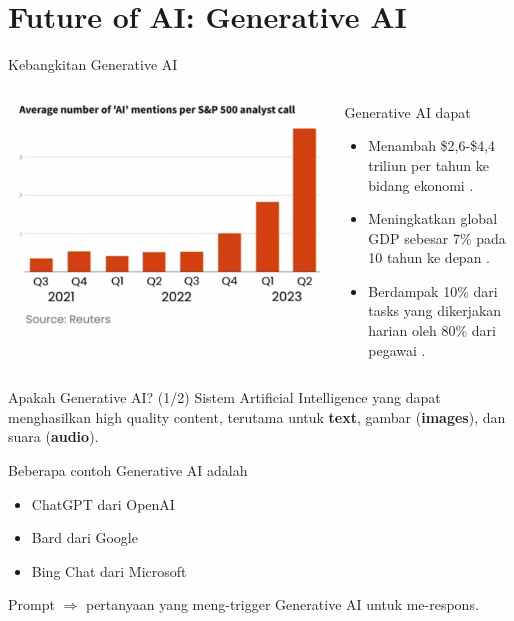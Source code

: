 \documentclass[pdf]{beamer}
\theoremstyle{mystyle}
\begin{document}
\section{Future of AI: Generative AI}
\begin{frame}{Kebangkitan Generative AI}
	\begin{columns}
		\begin{column}{.5\textwidth}
			\begin{center}
				\includegraphics[width=\textwidth]{images/rise-generative-reuters.png}
			\end{center}
		\end{column}
		\begin{column}{.5\textwidth}
			Generative AI dapat
			\begin{itemize}
				\item<2-> Menambah \$2,6-\$4,4 triliun per tahun ke bidang ekonomi \citep{mckinsey2023economic}.
				\item<3-> Meningkatkan global GDP sebesar 7\% pada 10 tahun ke depan \citep{goldman2023large}.
				\item<4-> Berdampak 10\% dari tasks yang dikerjakan harian oleh 80\% dari pegawai \citep{eloundou2023gpts}.
			\end{itemize}			
		\end{column}
	\end{columns}
\end{frame}

\begin{frame}{Apakah Generative AI? (1/2)}
	Sistem Artificial Intelligence yang dapat menghasilkan high quality content, terutama untuk \textbf{text}, gambar (\textbf{images}), dan suara (\textbf{audio}). 
	
	\bigskip
	Beberapa contoh Generative AI adalah
			\begin{itemize}
	\item<2-> ChatGPT dari OpenAI
	\item<3-> Bard dari Google
	\item<4-> Bing Chat dari Microsoft
	\end{itemize}			
	
	\bigskip
	Prompt $\Rightarrow$ pertanyaan yang meng-trigger Generative AI untuk me-respons.
\end{frame}
\end{document}
